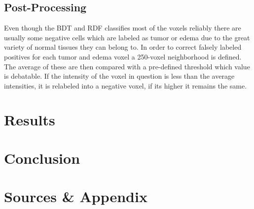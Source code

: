 \documentclass[
12pt,
headsepline,
bibliography=totoc,
twoside=semi,
fleqn
]{scrartcl}
\begin{document}
  \subsection{Post-Processing\label{sec:sec3-4}}
    Even though the BDT and RDF classifies most of the voxels reliably there are usually some negative cells which are labeled as tumor or edema due to the great variety of normal tissues they can belong to. In order to correct falsely labeled positives for each tumor and edema voxel a 250-voxel neighborhood is defined. The average of these are then compared with a pre-defined threshold which value is debatable. If the intensity of the voxel in question is less than the average intensities, it is relabeled into a negative voxel, if its higher it remains the same.
\section{Results\label{sec:sec4}}

\section{Conclusion\label{sec:sec5}}

\section{Sources \& Appendix\label{sec.sec5}}

\end{document}
